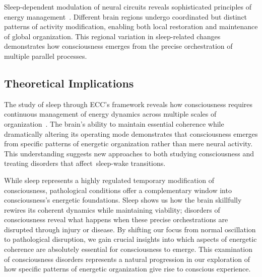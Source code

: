 Sleep-dependent modulation of neural circuits reveals sophisticated principles of energy management~\cite{hunt2024electromagnetic}. Different brain regions undergo coordinated but distinct patterns of activity modification, enabling both local restoration and maintenance of global organization. This regional variation in sleep-related changes demonstrates how consciousness emerges from the precise orchestration of multiple parallel processes.

\subsection*{Theoretical Implications}

The study of sleep through ECC's framework reveals how consciousness requires continuous management of energy dynamics across multiple scales of organization~\cite{van2025processes}. The brain's ability to maintain essential coherence while dramatically altering its operating mode demonstrates that consciousness emerges from specific patterns of energetic organization rather than mere neural activity. This understanding suggests new approaches to both studying consciousness and treating disorders that affect~sleep-wake transitions.

While sleep represents a highly regulated temporary modification of consciousness, pathological conditions offer a complementary window into consciousness's energetic foundations. Sleep shows us how the brain skillfully rewires its coherent dynamics while maintaining viability; disorders of consciousness reveal what happens when these precise orchestrations are disrupted through injury or disease. By shifting our focus from normal oscillation to pathological disruption, we gain crucial insights into which aspects of energetic coherence are absolutely essential for consciousness to emerge. This examination of consciousness disorders represents a natural progression in our exploration of how specific patterns of energetic organization give rise to conscious experience.
